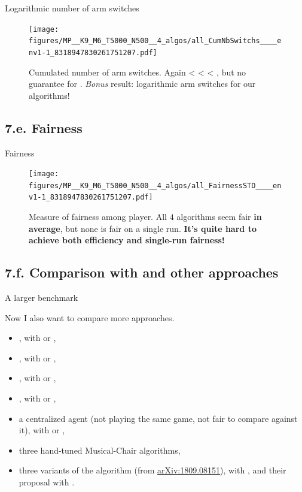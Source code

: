\documentclass[12pt,english,ignorenonframetext,]{beamer}
\providecommand{\tightlist}{%
  \setlength{\itemsep}{0pt}\setlength{\parskip}{0pt}}
\begin{document}
\begin{frame}[plain]{Logarithmic number of arm switches}

\begin{figure}[h!]
\centering
\texttt{[image: figures/MP\_\_K9\_M6\_T5000\_N500\_\_4\_algos/all\_CumNbSwitchs\_\_\_\_env1-1\_8318947830261751207.pdf]}
\caption{\footnotesize{Cumulated number of arm switches. Again \textcolor{blue}{\rhoRand{}} < \textcolor{red}{\RandTopM{}} < \textcolor{bluegreen}{\Selfish{}} < \textcolor{yellowgreen}{\MCTopM{}}, but no guarantee for \textcolor{blue}{\rhoRand{}}. \emph{Bonus} result: logarithmic arm switches for our algorithms!}}
\end{figure}

\end{frame}


\subsection{\hfill{}7.e. Fairness\hfill{}}

\begin{frame}[plain]{Fairness}

\begin{figure}[h!]
\centering
\texttt{[image: figures/MP\_\_K9\_M6\_T5000\_N500\_\_4\_algos/all\_FairnessSTD\_\_\_\_env1-1\_8318947830261751207.pdf]}
\caption{\footnotesize{Measure of fairness among player. All $4$ algorithms seem fair \textbf{in average}, but none is fair on a single run. \textbf{It's quite hard to achieve both efficiency and single-run fairness!}}}
\end{figure}

\end{frame}


\subsection{\hfill{}7.f. Comparison with \SICMMAB{} and other approaches\hfill{}}


\begin{frame}{A larger benchmark}

Now I also want to compare more approaches.

\begin{itemize}\tightlist
  \item \rhoRand, with \UCB{} or \klUCB{},
  \item \RandTopM, with \UCB{} or \klUCB{},
  \item \MCTopM, with \UCB{} or \klUCB{},
  \item \Selfish, with \UCB{} or \klUCB{},
  \item a centralized agent (\alert{not playing the same game, not fair to compare against it}), with \UCB{} or \klUCB{},
  \item three hand-tuned Musical-Chair algorithms,
  \item three variants of the \SICMMAB{} algorithm (from \textcolor{blue}{\href{https://arxiv.org/abs/1809.08151}{arXiv:1809.08151}}), with \UCB, \klUCB{} and their proposal with \UCBH.
\end{itemize}

\end{frame}
\end{document}
